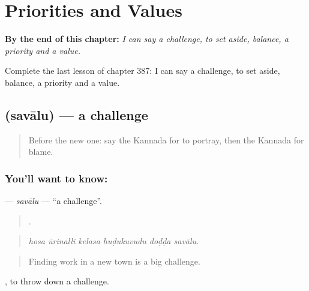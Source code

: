 
\chapter{Priorities and Values}
\label{ch:ka-priorities-and-values}

\begin{chapteropening}
\textbf{By the end of this chapter:} \emph{I can say a challenge, to set aside, balance, a priority and a value.}

Complete the last lesson of chapter 387: I can say a challenge, to set aside, balance, a priority and a value.
\end{chapteropening}

\section[\texorpdfstring{\kn{ಸವಾಲು} (savālu)}{ಸವಾಲು (savālu)}]{ (savālu) — a challenge}

\label{lesson:KA-C387-savalu}



\begin{quote}
Before the new one: say the Kannada for to portray, then the Kannada for blame.
\end{quote}

\subsection*{You'll want to know: }
\textbf{} — \emph{savālu} — \textquotedblleft{}a challenge\textquotedblright{}.

\begin{quote}
     .
\end{quote}

\begin{quote}
\emph{hosa ūrinalli kelasa huḍukuvudu doḍḍa savālu.}
\end{quote}

\begin{quote}
Finding work in a new town is a big challenge.
\end{quote}

 , to throw down a challenge.


